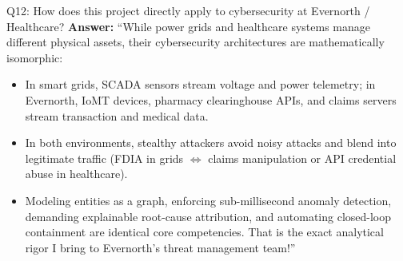 \documentclass[10pt,a4paper]{article}
\begin{document}
\begin{qabox}{Q12: How does this project directly apply to cybersecurity at Evernorth / Healthcare?}
\textbf{Answer:}
``While power grids and healthcare systems manage different physical assets, their cybersecurity architectures are mathematically isomorphic:
\begin{itemize}[noitemsep]
    \item In smart grids, SCADA sensors stream voltage and power telemetry; in Evernorth, IoMT devices, pharmacy clearinghouse APIs, and claims servers stream transaction and medical data.
    \item In both environments, stealthy attackers avoid noisy attacks and blend into legitimate traffic (FDIA in grids $\Longleftrightarrow$ claims manipulation or API credential abuse in healthcare).
    \item Modeling entities as a graph, enforcing sub-millisecond anomaly detection, demanding explainable root-cause attribution, and automating closed-loop containment are identical core competencies. That is the exact analytical rigor I bring to Evernorth's threat management team!''
\end{itemize}
\end{qabox}
\end{document}
